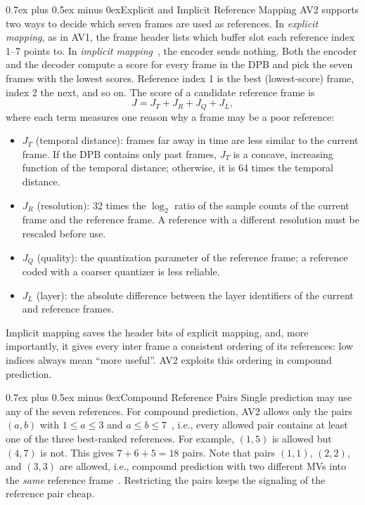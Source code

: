 \documentclass[journal]{IEEEtran}
\makeatletter
\def\subsection{\@startsection{subsection}{2}{\z@}{2.5ex plus 1ex minus 1ex}%
{0.7ex plus 0.5ex minus 0ex}{\normalfont\normalsize\itshape}}%
\makeatother
\begin{document}
\subsection{Explicit and Implicit Reference Mapping}
AV2 supports two ways to decide which seven frames are used as references.
In \emph{explicit mapping}, as in AV1, the frame header lists which buffer
slot each reference index 1--7 points to. In \emph{implicit
mapping}~\cite{cwgB091}, the encoder sends nothing. Both the encoder and the decoder compute a score for
every frame in the DPB and pick the seven frames with the lowest scores.
Reference index 1 is the best (lowest-score) frame, index 2 the next, and so
on. The score of a candidate reference frame is
\begin{equation}
  J = J_T + J_R + J_Q + J_L ,
  \label{eq:refscore}
\end{equation}
where each term measures one reason why a frame may be a poor reference:
\begin{itemize}
  \item $J_T$ (temporal distance): frames far away in time are less similar
        to the current frame. If the DPB contains only past frames, $J_T$ is a
        concave, increasing function of the temporal distance; otherwise, it is
        64 times the temporal distance.
  \item $J_R$ (resolution): 32 times the $\log_2$ ratio of the sample counts of
        the current frame and the reference frame. A reference with a
        different resolution must be rescaled before use.
  \item $J_Q$ (quality): the quantization parameter of the reference frame;
        a reference coded with a coarser quantizer is less reliable.
  \item $J_L$ (layer): the absolute difference between the layer identifiers of the
        current and reference frames.
\end{itemize}
Implicit mapping saves the header bits of explicit mapping, and, more
importantly, it gives every inter frame a consistent ordering of its
references: low indices always mean ``more useful''. AV2 exploits this
ordering in compound prediction.

\subsection{Compound Reference Pairs}
Single prediction may use any of the seven references. For compound
prediction, AV2 allows only the pairs $(a,b)$ with $1\le a\le 3$ and
$a\le b\le 7$~\cite{cwgB091}, i.e., every allowed pair contains at least one of the three
best-ranked references. For example, $(1,5)$ is allowed but $(4,7)$ is not.
This gives $7+6+5=18$ pairs. Note that pairs $(1,1)$, $(2,2)$, and $(3,3)$
are allowed, i.e., compound prediction with two different MVs into the
\emph{same} reference frame~\cite{cwgC042}. Restricting the
pairs keeps the signaling of the reference pair cheap.
\end{document}
